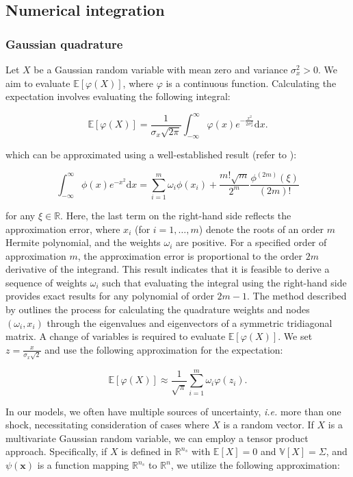 \documentclass[a4paper,11pt]{amsart}
\begin{document}
\subsection{Numerical integration}

\subsubsection{Gaussian quadrature}
Let $X$ be a Gaussian random variable with mean zero and
variance $\sigma^2_x > 0$. We aim to
evaluate $\mathbb{E}[\varphi(X)]$, where $\varphi$ is a continuous
function. Calculating the expectation involves evaluating the following integral:

\[
   \mathbb{E}[\varphi(X)] = \frac{1}{\sigma_x \sqrt{2\pi}} \int_{-\infty}^{\infty} \varphi(x) e^{-\frac{x^2}{2\sigma^2_x}} \mathrm{d}x.
\]

which can be approximated using a well-established result (refer to \textcite{JuddBook1998}):

\[
   \int_{-\infty}^{\infty} \phi(x) e^{-x^2} \mathrm{d}x = \sum_{i=1}^m \omega_i \phi(x_i) + \frac{m! \sqrt{m}}{2^m} \frac{\phi^{(2m)}(\xi)}{(2m)!}
\]

for any $\xi \in \mathbb{R}$. Here, the last term on the right-hand
side reflects the approximation error, where $x_i$ (for $i=1,\dots,m$)
denote the roots of an order $m$ Hermite polynomial, and the
weights $\omega_i$ are positive. For a specified order of
approximation $m$, the approximation error is proportional to the
order $2m$ derivative of the integrand. This result indicates that it
is feasible to derive a sequence of weights $\omega_i$ such that
evaluating the integral using the right-hand side provides exact
results for any polynomial of order $2m-1$. The method described by
\textcite{GolubWelsch1969} outlines the process for calculating the
quadrature weights and nodes $(\omega_i,x_i)$ through the eigenvalues
and eigenvectors of a symmetric tridiagonal matrix. A change of
variables is required to evaluate $\mathbb{E}[\varphi(X)]$. We
set $z = \frac{x}{\sigma_x \sqrt{2}}$ and use the following approximation for the expectation:

\[
   \mathbb{E}[\varphi(X)] \approx \frac{1}{\sqrt{\pi}} \sum_{i=1}^m \omega_i \varphi(z_i).
\]

In our models, we often have multiple sources of uncertainty,
\emph{i.e.} more than one shock, necessitating consideration of cases
where $X$ is a random vector. If $X$ is a multivariate Gaussian random
variable, we can employ a tensor product approach. Specifically,
if $X$ is defined in $\mathbb{R}^{n_s}$ with $\mathbb{E}[X] = 0$
and $\mathbb{V}[X] = \Sigma$, and $\psi(\mathbf{x})$ is a function
mapping $\mathbb{R}^{n_s}$ to $\mathbb{R}^n$, we utilize the following
approximation:
\end{document}
